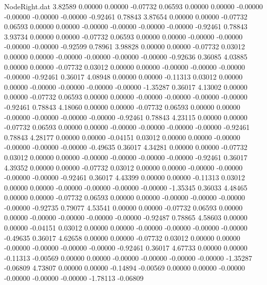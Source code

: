 \begin{filecontents}{NodeRight.dat}
   3.82589    0.00000    0.00000    -0.07732    0.06593    0.00000    0.00000   -0.00000   -0.00000   -0.00000   -0.00000   -0.92461    0.78843
   3.87654    0.00000    0.00000    -0.07732    0.06593    0.00000    0.00000   -0.00000   -0.00000   -0.00000   -0.00000   -0.92461    0.78843
   3.93734    0.00000    0.00000    -0.07732    0.06593    0.00000    0.00000   -0.00000   -0.00000   -0.00000   -0.00000   -0.92599    0.78961
   3.98828    0.00000    0.00000    -0.07732    0.03012    0.00000    0.00000   -0.00000   -0.00000   -0.00000   -0.00000   -0.92636    0.36085
   4.03885    0.00000    0.00000    -0.07732    0.03012    0.00000    0.00000   -0.00000   -0.00000   -0.00000   -0.00000   -0.92461    0.36017
   4.08948    0.00000    0.00000    -0.11313    0.03012    0.00000    0.00000   -0.00000   -0.00000   -0.00000   -0.00000   -1.35287    0.36017
   4.13002    0.00000    0.00000    -0.07732    0.06593    0.00000    0.00000   -0.00000   -0.00000   -0.00000   -0.00000   -0.92461    0.78843
   4.18060    0.00000    0.00000    -0.07732    0.06593    0.00000    0.00000   -0.00000   -0.00000   -0.00000   -0.00000   -0.92461    0.78843
   4.23115    0.00000    0.00000    -0.07732    0.06593    0.00000    0.00000   -0.00000   -0.00000   -0.00000   -0.00000   -0.92461    0.78843
   4.28177    0.00000    0.00000    -0.04151    0.03012    0.00000    0.00000   -0.00000   -0.00000   -0.00000   -0.00000   -0.49635    0.36017
   4.34281    0.00000    0.00000    -0.07732    0.03012    0.00000    0.00000   -0.00000   -0.00000   -0.00000   -0.00000   -0.92461    0.36017
   4.39352    0.00000    0.00000    -0.07732    0.03012    0.00000    0.00000   -0.00000   -0.00000   -0.00000   -0.00000   -0.92461    0.36017
   4.43399    0.00000    0.00000    -0.11313    0.03012    0.00000    0.00000   -0.00000   -0.00000   -0.00000   -0.00000   -1.35345    0.36033
   4.48465    0.00000    0.00000    -0.07732    0.06593    0.00000    0.00000   -0.00000   -0.00000   -0.00000   -0.00000   -0.92735    0.79077
   4.53541    0.00000    0.00000    -0.07732    0.06593    0.00000    0.00000   -0.00000   -0.00000   -0.00000   -0.00000   -0.92487    0.78865
   4.58603    0.00000    0.00000    -0.04151    0.03012    0.00000    0.00000   -0.00000   -0.00000   -0.00000   -0.00000   -0.49635    0.36017
   4.62658    0.00000    0.00000    -0.07732    0.03012    0.00000    0.00000   -0.00000   -0.00000   -0.00000   -0.00000   -0.92461    0.36017
   4.67733    0.00000    0.00000    -0.11313   -0.00569    0.00000    0.00000   -0.00000   -0.00000   -0.00000   -0.00000   -1.35287   -0.06809
   4.73807    0.00000    0.00000    -0.14894   -0.00569    0.00000    0.00000   -0.00000   -0.00000   -0.00000   -0.00000   -1.78113   -0.06809

\end{filecontents}

